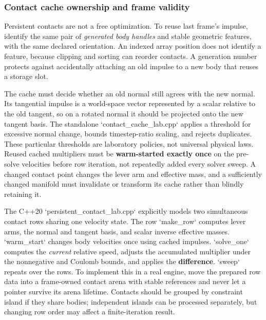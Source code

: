 \subsubsection{Contact cache ownership and frame validity}\label{06-engine-ii-ch046-contact-cache-ownership-and-frame-validity}

\hypertarget{06-engine-ii-ch046-contact-cache-ownership-and-frame-validity}{}

Persistent contacts are not a free optimization. To reuse last frame's impulse, identify the same pair of \emph{generated body handles} and stable geometric features, with the same declared orientation. An indexed array position does not identify a feature, because clipping and sorting can reorder contacts. A generation number protects against accidentally attaching an old impulse to a new body that reuses a storage slot.

The cache must decide whether an old normal still agrees with the new normal. Its tangential impulse is a world-space vector represented by a scalar relative to the old tangent, so on a rotated normal it should be projected onto the new tangent basis. The standalone `contact\_cache\_lab.cpp` applies a threshold for excessive normal change, bounds timestep-ratio scaling, and rejects duplicates. These particular thresholds are laboratory policies, not universal physical laws. Reused cached multipliers must be \textbf{warm-started exactly once} on the pre-solve velocities before row iteration, not repeatedly added every solver sweep. A changed contact point changes the lever arm and effective mass, and a sufficiently changed manifold must invalidate or transform its cache rather than blindly retaining it.

The C++20 `persistent\_contact\_lab.cpp` explicitly models two simultaneous contact rows sharing one velocity state. The row `make\_row` computes lever arms, the normal and tangent basis, and scalar inverse effective masses. `warm\_start` changes body velocities once using cached impulses. `solve\_one` computes the \emph{current} relative speed, adjusts the accumulated multiplier under the nonnegative and Coulomb bounds, and applies the \textbf{difference}. `sweep` repeats over the rows. To implement this in a real engine, move the prepared row data into a frame-owned contact arena with stable references and never let a pointer survive its arena lifetime. Contacts should be grouped by constraint island if they share bodies; independent islands can be processed separately, but changing row order may affect a finite-iteration result.

